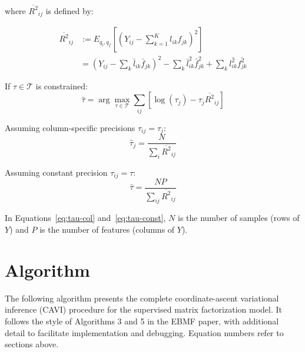 \documentclass{article}[12pt]
\newcommand{\lbar}[2]{\bar{l}_{#1#2}}
\newcommand{\fbar}[2]{\bar{f}_{#1#2}}
\newcommand{\lsec}[2]{\overline{l^{2}_{#1#2}}}
\newcommand{\fsec}[2]{\overline{f^{2}_{#1#2}}}
\begin{document}
where $\overline{R^2}_{ij}$ is defined by:

\begin{align}
    \overline{R^2}_{ij}
    &:= E_{q_l, q_f}\!\left[\left(Y_{ij} - \sum_{k=1}^{K}l_{ik}f_{jk}\right)^2\right]\\
    &= \left(Y_{ij} - \sum_k\lbar{i}{k}\fbar{j}{k}\right)^2
       - \sum_k\lbar{i}{k}^2\fbar{j}{k}^2
       + \sum_k\lsec{i}{k}\fsec{j}{k}
\end{align}

If $\tau \in \mathcal{T}$ is constrained:
\begin{equation}
    \hat{\tau} = \arg\max_{\tau\in\mathcal{T}}\sum_{ij}
    \left[\log(\tau_j) - \tau_j\overline{R^2}_{ij}\right]
\end{equation}

Assuming column-specific precisions $\tau_{ij} = \tau_j$:
\begin{equation}\label{eq:tau-col}
    \hat{\tau}_j = \frac{N}{\displaystyle\sum_i\overline{R^2}_{ij}}
\end{equation}

Assuming constant precision $\tau_{ij} = \tau$:
\begin{equation}\label{eq:tau-const}
    \hat{\tau} = \frac{NP}{\displaystyle\sum_{ij}\overline{R^2}_{ij}}
\end{equation}

In Equations~\ref{eq:tau-col} and~\ref{eq:tau-const}, $N$ is the number of
samples (rows of $Y$) and $P$ is the number of features (columns of $Y$).

\section{Algorithm}

The following algorithm presents the complete coordinate-ascent variational
inference (CAVI) procedure for the supervised matrix factorization model.
It follows the style of Algorithms 3 and 5 in the EBMF paper, with additional
detail to facilitate implementation and debugging. Equation numbers refer to
sections above.

\medskip
\end{document}
